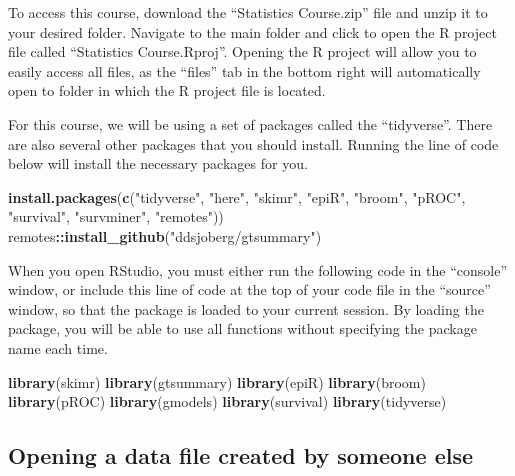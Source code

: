 \documentclass[]{book}
\newenvironment{Shaded}{\begin{snugshade}}{\end{snugshade}}
\newcommand{\KeywordTok}[1]{\textcolor[rgb]{0.13,0.29,0.53}{\textbf{#1}}}
\newcommand{\NormalTok}[1]{#1}
\newcommand{\OperatorTok}[1]{\textcolor[rgb]{0.81,0.36,0.00}{\textbf{#1}}}
\newcommand{\StringTok}[1]{\textcolor[rgb]{0.31,0.60,0.02}{#1}}
\begin{document}
To access this course, download the ``Statistics Course.zip'' file and
unzip it to your desired folder. Navigate to the main folder and click
to open the R project file called ``Statistics Course.Rproj''. Opening
the R project will allow you to easily access all files, as the
``files'' tab in the bottom right will automatically open to folder in
which the R project file is located.

For this course, we will be using a set of packages called the
``tidyverse''. There are also several other packages that you should
install. Running the line of code below will install the necessary
packages for you.

\begin{Shaded}
\begin{Highlighting}[]
\KeywordTok{install.packages}\NormalTok{(}\KeywordTok{c}\NormalTok{(}\StringTok{"tidyverse"}\NormalTok{, }\StringTok{"here"}\NormalTok{, }\StringTok{"skimr"}\NormalTok{, }\StringTok{"epiR"}\NormalTok{, }\StringTok{"broom"}\NormalTok{, }\StringTok{"pROC"}\NormalTok{, }\StringTok{"survival"}\NormalTok{, }\StringTok{"survminer"}\NormalTok{, }\StringTok{"remotes"}\NormalTok{))}
\NormalTok{remotes}\OperatorTok{::}\KeywordTok{install_github}\NormalTok{(}\StringTok{"ddsjoberg/gtsummary"}\NormalTok{)}
\end{Highlighting}
\end{Shaded}

When you open RStudio, you must either run the following code in the
``console'' window, or include this line of code at the top of your code
file in the ``source'' window, so that the package is loaded to your
current session. By loading the package, you will be able to use all
functions without specifying the package name each time.

\begin{Shaded}
\begin{Highlighting}[]
\KeywordTok{library}\NormalTok{(skimr)}
\KeywordTok{library}\NormalTok{(gtsummary)}
\KeywordTok{library}\NormalTok{(epiR)}
\KeywordTok{library}\NormalTok{(broom)}
\KeywordTok{library}\NormalTok{(pROC)}
\KeywordTok{library}\NormalTok{(gmodels)}
\KeywordTok{library}\NormalTok{(survival)}
\KeywordTok{library}\NormalTok{(tidyverse)}
\end{Highlighting}
\end{Shaded}

\hypertarget{opening-a-data-file-created-by-someone-else-1}{%
\subsection{Opening a data file created by someone
else}\label{opening-a-data-file-created-by-someone-else-1}}
\end{document}
